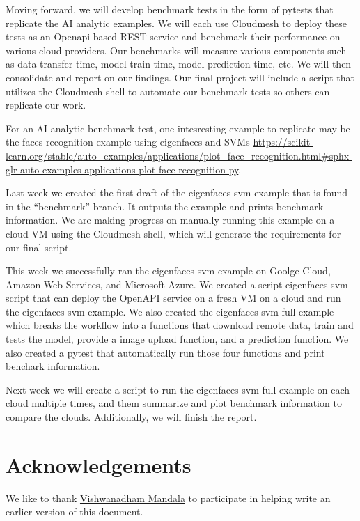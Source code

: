 Moving forward, we will develop benchmark tests in the form of pytests
that replicate the AI analytic examples. We will each use Cloudmesh to
deploy these tests as an Openapi based REST service and benchmark their
performance on various cloud providers. Our benchmarks will measure
various components such as data transfer time, model train time, model
prediction time, etc. We will then consolidate and report on our
findings. Our final project will include a script that utilizes the
Cloudmesh shell to automate our benchmark tests so others can replicate
our work.

For an AI analytic benchmark test, one intesresting example to replicate
may be the faces recognition example using eigenfaces and SVMs
\url{https://scikit-learn.org/stable/auto_examples/applications/plot_face_recognition.html\#sphx-glr-auto-examples-applications-plot-face-recognition-py}.

Last week we created the first draft of the eigenfaces-svm example that
is found in the ``benchmark'' branch. It outputs the example and prints
benchmark information. We are making progress on manually running this
example on a cloud VM using the Cloudmesh shell, which will generate the
requirements for our final script.

This week we successfully ran the eigenfaces-svm example on Goolge
Cloud, Amazon Web Services, and Microsoft Azure. We created a script
eigenfaces-svm-script that can deploy the OpenAPI service on a fresh VM
on a cloud and run the eigenfaces-svm example. We also created the
eigenfaces-svm-full example which breaks the workflow into a functions
that download remote data, train and tests the model, provide a image
upload function, and a prediction function. We also created a pytest
that automatically run those four functions and print benchark
information.

Next week we will create a script to run the eigenfaces-svm-full example
on each cloud multiple times, and them summarize and plot benchmark
information to compare the clouds. Additionally, we will finish the
report.

\section*{Acknowledgements}\label{acknowledgements}

We like to thank
\href{https://github.com/cybertraining-dsc/fa20-523-325/}{Vishwanadham
Mandala} to participate in helping write an earlier version of this
document.

